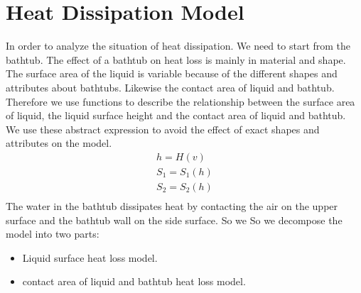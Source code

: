 \documentclass{mcmthesis}
\begin{document}
\section{Heat Dissipation Model}
In order to analyze the situation of heat dissipation. 
We need to start from the bathtub.
The effect of a bathtub on heat loss is mainly in material and shape.\\
\indent The surface area of the liquid is variable because of the different shapes and attributes about bathtubs. Likewise the contact area of liquid and bathtub. Therefore we use functions to describe the relationship between the surface area of liquid, the liquid surface height and the contact area of liquid and bathtub. \\
\indent We use these abstract expression to avoid the effect of exact shapes and attributes on the model.
\begin{equation}
\begin{split}
h=H(v)  \\
S_{1}=S_{1}(h) \\
S_{2}=S_{2}(h)  \\
\end{split}
\end{equation}
\indent The water in the bathtub dissipates heat by contacting the air on the upper surface and the bathtub wall on the side surface. So we So we decompose the model into two parts:\\
\begin{itemize}
\item{Liquid surface heat loss model.\\ }
\item{contact area of liquid and bathtub heat loss model.\\ }
\end{itemize}
\end{document}
